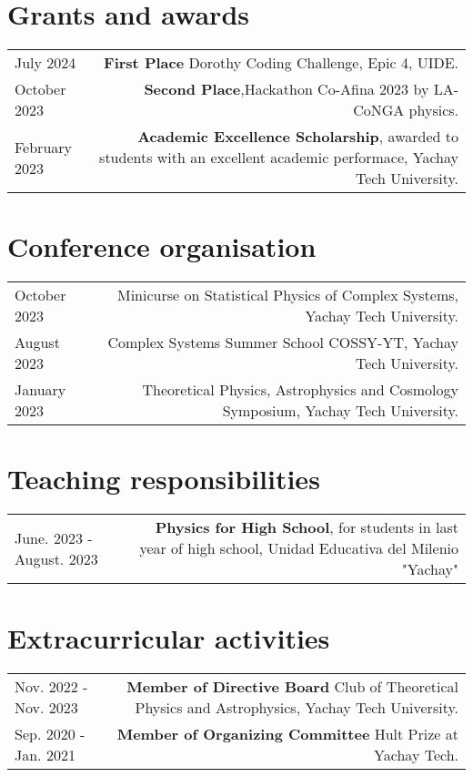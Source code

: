 \documentclass{article}
\begin{document}
\section*{Grants and awards}

\begin{tabular}{L!{\vrule}R}
    July 2024 & \textbf{First Place} Dorothy Coding Challenge, Epic 4, UIDE. \\
    October 2023 & \textbf{Second Place},Hackathon Co-Afina 2023 by LA-CoNGA physics. \\
    February 2023 & \textbf{Academic Excellence Scholarship}, awarded to students with an excellent academic performace, Yachay Tech University. \\
    
\end{tabular}


\section*{Conference organisation}

\begin{tabular}{L!{\vrule}R}
  October 2023  & Minicurse on Statistical Physics of Complex Systems, Yachay Tech University. \\
  August 2023  & Complex Systems Summer School COSSY-YT, Yachay Tech University. \\
  January 2023 & Theoretical Physics, Astrophysics and Cosmology Symposium, Yachay Tech University.\\
\end{tabular}
\section*{Teaching responsibilities}

\begin{tabular}{L!{\vrule}R}

  June. 2023 - August. 2023 & \textbf{Physics for High School}, for students in last year of high school, Unidad Educativa del Milenio "Yachay"\\

\end{tabular}


\section*{Extracurricular activities}
\begin{tabular}{L!{\vrule}R}

  Nov. 2022 - Nov. 2023 & \textbf{Member of Directive Board} Club of Theoretical Physics and Astrophysics, Yachay Tech University. \\

  Sep. 2020 - Jan. 2021 & \textbf{Member of Organizing Committee} Hult Prize at Yachay Tech. \\
\end{tabular}
\end{document}

